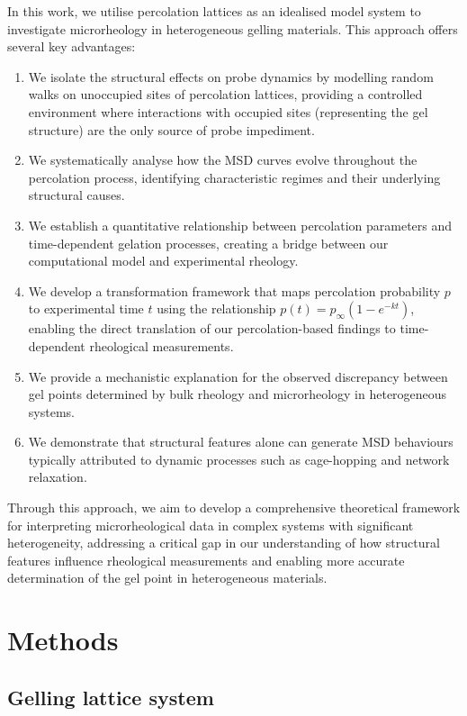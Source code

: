 \documentclass[%
 aip,
 amsmath,amssymb,
reprint, onecolumn %
]{revtex4-1}
\begin{document}
In this work, we utilise percolation lattices as an idealised model system to investigate microrheology in heterogeneous gelling materials. This approach offers several key advantages:
\begin{enumerate}
    \item We isolate the structural effects on probe dynamics by modelling random walks on unoccupied sites of percolation lattices, providing a controlled environment where interactions with occupied sites (representing the gel structure) are the only source of probe impediment.
    \item We systematically analyse how the MSD curves evolve throughout the percolation process, identifying characteristic regimes and their underlying structural causes.
    \item We establish a quantitative relationship between percolation parameters and time-dependent gelation processes, creating a bridge between our computational model and experimental rheology.
    \item We develop a transformation framework that maps percolation probability $p$ to experimental time $t$ using the relationship $p(t) = p_\infty(1-e^{-kt})$, enabling the direct translation of our percolation-based findings to time-dependent rheological measurements.
    \item We provide a mechanistic explanation for the observed discrepancy between gel points determined by bulk rheology and microrheology in heterogeneous systems.
    \item We demonstrate that structural features alone can generate MSD behaviours typically attributed to dynamic processes such as cage-hopping and network relaxation.
\end{enumerate}
Through this approach, we aim to develop a comprehensive theoretical framework for interpreting microrheological data in complex systems with significant heterogeneity, addressing a critical gap in our understanding of how structural features influence rheological measurements and enabling more accurate determination of the gel point in heterogeneous materials.

\section{Methods}
\subsection{Gelling lattice system}
\end{document}
